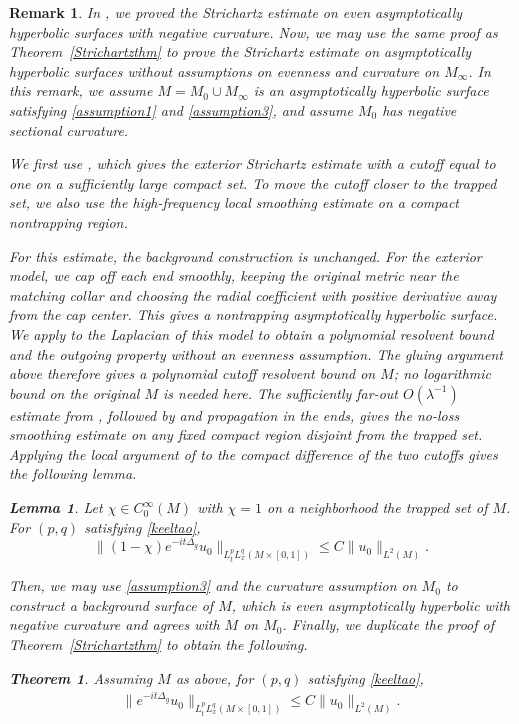 \documentclass[11pt]{amsart}
\newcommand{\la}{\lambda}
\newtheorem{theorem}{Theorem}
\newtheorem{lemma}{Lemma}[section]
\newtheorem*{remark}{Remark}
\begin{document}
\begin{remark}
    \textnormal{In \cite{HSTZ}, we proved the Strichartz estimate on even asymptotically hyperbolic surfaces with negative curvature. Now, we may use the same proof as Theorem~\ref{Strichartzthm} to prove the Strichartz estimate on asymptotically hyperbolic surfaces without assumptions on evenness and curvature on $M_\infty$. In this remark, we assume $M=M_0\cup M_\infty$ is an asymptotically hyperbolic surface satisfying \eqref{assumption1} and \eqref{assumption3}, and assume $M_0$ has negative sectional curvature.}
    
    \textnormal{We first use \cite[Theorem 1.2]{bouclet}, which gives the exterior Strichartz estimate with a cutoff equal to one on a sufficiently large compact set. To move the cutoff closer to the trapped set, we also use the high-frequency local smoothing estimate on a compact nontrapping region.}

\textnormal{For this estimate, the background construction is unchanged. For the exterior model, we cap off each end smoothly, keeping the original metric near the matching collar and choosing the radial coefficient with positive derivative away from the cap center. This gives a nontrapping asymptotically hyperbolic surface. We apply \cite[Theorems 1.1 and 1.2]{WangAH} to the Laplacian of this model to obtain a polynomial resolvent bound and the outgoing property without an evenness assumption. The gluing argument above therefore gives a polynomial cutoff resolvent bound on $M$; no logarithmic bound on the original $M$ is needed here. The sufficiently far-out $O(\la^{-1})$ estimate from \cite[Theorem 1.1]{Cardoso2002UniformEO}, followed by \cite[Theorem 1.3]{nontrappinglocalsmoothing} and propagation in the ends, gives the no-loss smoothing estimate on any fixed compact region disjoint from the trapped set. Applying the local argument of \cite[Theorem 3.6]{BGH} to the compact difference of the two cutoffs gives the following lemma.}
    \begin{lemma}
        Let $\chi\in C_0^{\infty}(M)$ with $\chi=1$ on a neighborhood the trapped set of $M$. For $(p,q)$ satisfying \eqref{keeltao},
    \begin{equation}\label{eq:hyperbolicstri-nontrap}
    \|(1-\chi)e^{-it\Delta_g}u_0\|_{L^p_tL^q_x(M\times [0,1])}\leq C \|u_0\|_{L^2(M)}.
\end{equation}
    \end{lemma}
    \textnormal{Then, we may use \eqref{assumption3} and the curvature assumption on $M_0$ to construct a background surface of $M$, which is even asymptotically hyperbolic with negative curvature and agrees with $M$ on $M_0$. Finally, we duplicate the proof of Theorem~\ref{Strichartzthm} to obtain the following.}
    \begin{theorem}
         Assuming $M$ as above, for $(p,q)$ satisfying \eqref{keeltao}, \begin{align}\label{eq:hyperbolicthmstrichart}
    \|e^{-it\Delta_g}u_0\|_{L^p_tL^q_x(M\times [0,1])}\leq C \|u_0\|_{L^2(M)}.
    \end{align}
    \end{theorem}
\end{remark}
\end{document}
